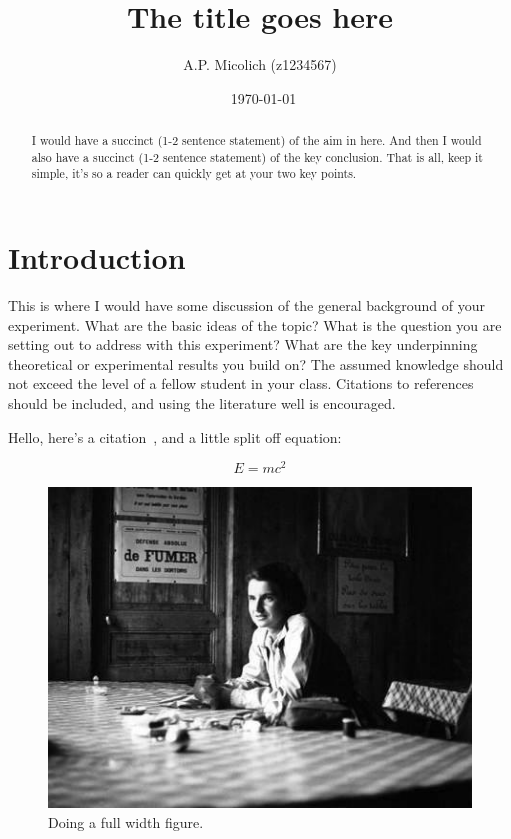 \documentclass[aps,prl,reprint,10pt,amsmath,amssymb,superscriptaddress,a4paper]{revtex4-2}
\begin{document}
\title{The title goes here}

\author{A.P. Micolich (z1234567)}
\date{\currenttime~\today}

\begin{abstract}
I would have a succinct (1-2 sentence statement) of the aim in here. And then I would also have a succinct (1-2 sentence statement) of the key conclusion. That is all, keep it simple, it's so a reader can quickly get at your two key points.
\end{abstract}

\maketitle

\section{Introduction}
This is where I would have some discussion of the general background of your experiment. What are the basic ideas of the topic? What is the question you are setting out to address with this experiment? What are the key underpinning theoretical or experimental results you build on? The assumed knowledge should not exceed the level of a fellow student in your class. Citations to references should be included, and using the literature well is encouraged.

\lipsum[1] %
Hello, here's a citation~\citep{PerssonLangmuir10}, and a little split off equation:

\begin{equation}
\label{eqn1}
E = mc^2
\end{equation}

\begin{figure}
\includegraphics[width = 16 cm]{physicist}
\caption{Doing a full width figure.}
\end{figure}
\end{document}
